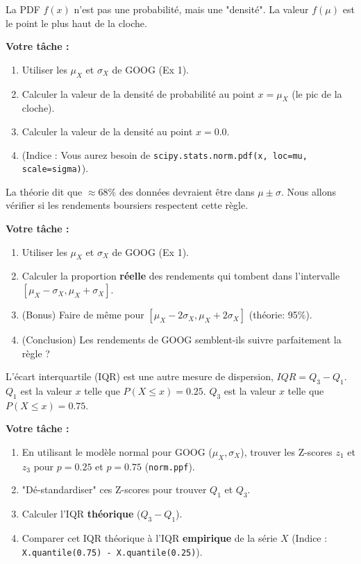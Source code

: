\begin{exercicebox}
La PDF $f(x)$ n'est pas une probabilité, mais une "densité". La valeur $f(\mu)$ est le point le plus haut de la cloche.

\textbf{Votre tâche :}
\begin{enumerate}
    \item Utiliser les $\mu_X$ et $\sigma_X$ de GOOG (Ex 1).
    \item Calculer la valeur de la densité de probabilité au point $x=\mu_X$ (le pic de la cloche).
    \item Calculer la valeur de la densité au point $x=0.0$.
    \item (Indice : Vous aurez besoin de \texttt{scipy.stats.norm.pdf(x, loc=mu, scale=sigma)}).
\end{enumerate}
\end{exercicebox}

\begin{exercicebox}
La théorie dit que $\approx 68\%$ des données devraient être dans $\mu \pm \sigma$. Nous allons vérifier si les rendements boursiers respectent cette règle.

\textbf{Votre tâche :}
\begin{enumerate}
    \item Utiliser les $\mu_X$ et $\sigma_X$ de GOOG (Ex 1).
    \item Calculer la proportion \textbf{réelle} des rendements qui tombent dans l'intervalle $[\mu_X - \sigma_X, \mu_X + \sigma_X]$.
    \item (Bonus) Faire de même pour $[\mu_X - 2\sigma_X, \mu_X + 2\sigma_X]$ (théorie: 95\%).
    \item (Conclusion) Les rendements de GOOG semblent-ils suivre parfaitement la règle ?
\end{enumerate}
\end{exercicebox}

\begin{exercicebox}
L'écart interquartile (IQR) est une autre mesure de dispersion, $IQR = Q_3 - Q_1$.
$Q_1$ est la valeur $x$ telle que $P(X \le x) = 0.25$.
$Q_3$ est la valeur $x$ telle que $P(X \le x) = 0.75$.

\textbf{Votre tâche :}
\begin{enumerate}
    \item En utilisant le modèle normal pour GOOG ($\mu_X, \sigma_X$), trouver les Z-scores $z_1$ et $z_3$ pour $p=0.25$ et $p=0.75$ (\texttt{norm.ppf}).
    \item "Dé-standardiser" ces Z-scores pour trouver $Q_1$ et $Q_3$.
    \item Calculer l'IQR \textbf{théorique} ($Q_3 - Q_1$).
    \item Comparer cet IQR théorique à l'IQR \textbf{empirique} de la série $X$ (Indice : \texttt{X.quantile(0.75) - X.quantile(0.25)}).
\end{enumerate}
\end{exercicebox}


